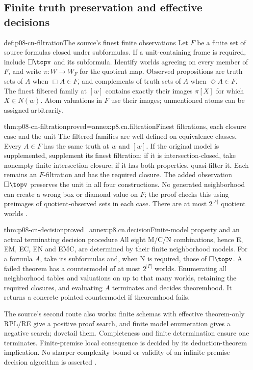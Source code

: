 \subsection{Finite truth preservation and effective decisions}
\label{sec:p08-cn-finite}

\begin{hbdefinition}{def:p08-cn-filtration}{The source's finest finite observations}
Let \(F\) be a finite set of source formulas closed under
subformulas. If a unit-containing frame is required, include
\(\Box\topv\) and its subformula. Identify worlds agreeing on
every member of \(F\), and write \(\pi:W\to W_F\) for the
quotient map. Observed propositions are truth sets of \(A\)
when \(\Box A\in F\), and complements of truth sets of \(A\)
when \(\Diamond A\in F\). The finest filtered family at
\([w]\) contains exactly their images \(\pi[X]\) for which
\(X\in N(w)\). Atom valuations in \(F\) use their images;
unmentioned atoms can be assigned arbitrarily.
\end{hbdefinition}

\begin{hbtheorem}{thm:p08-cn-filtration}{proved=annex:p8.cn.filtration}{Finest filtrations, each closure case and the unit}
The filtered families are well defined on equivalence classes.
Every \(A\in F\) has the same truth at \(w\) and \([w]\).
If the original model is supplemented, supplement its finest
filtration; if it is intersection-closed, take nonempty finite
intersection closure; if it has both properties, quasi-filter it.
Each remains an \(F\)-filtration and has the required closure.
The added observation \(\Box\topv\) preserves the unit in
all four constructions. No generated neighborhood can create a
wrong box or diamond value on \(F\); the proof checks this
using preimages of quotient-observed sets in each case.
There are at most \(2^{|F|}\) quotient worlds
\cite[theorems~7.12--7.17; exercise~7.49]{Chellas1980}.
\end{hbtheorem}

\begin{hbtheorem}{thm:p08-cn-decision}{proved=annex:p8.cn.decision}{Finite-model property and an actual terminating decision procedure}
All eight M/C/N combinations, hence E, EM, EC, EN and EMC, are
determined by their finite neighborhood models. For a formula \(A\),
take its subformulas and, when N is required, those of
\(\Box\topv\). A failed theorem has a countermodel of at most
\(2^{|F|}\) worlds. Enumerating all neighborhood tables and
valuations on up to that many worlds, retaining the required closures,
and evaluating \(A\) terminates and decides theoremhood.
It returns a concrete pointed countermodel if theoremhood fails.

The source's second route also works: finite schemas with effective
theorem-only RPL/RE give a positive proof search, and finite model
enumeration gives a negative search; dovetail them. Completeness and
finite determination ensure one terminates. Finite-premise local
consequence is decided by its deduction-theorem implication.
No sharper complexity bound or validity of an infinite-premise
decision algorithm is asserted
\cite[sec.~2.8; theorems~9.22--9.28; exercises~9.40, 9.44]{Chellas1980}.
\end{hbtheorem}

